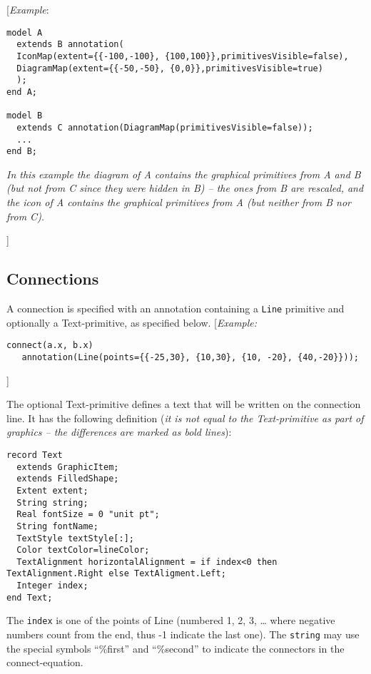 {[}\emph{Example}:

\begin{lstlisting}[language=modelica]
model A
  extends B annotation(
  IconMap(extent={{-100,-100}, {100,100}},primitivesVisible=false),
  DiagramMap(extent={{-50,-50}, {0,0}},primitivesVisible=true)
  );
end A;

model B
  extends C annotation(DiagramMap(primitivesVisible=false));
  ...
end B;
\end{lstlisting}
\emph{In this example the diagram of A contains the graphical primitives
from A and B (but not from C since they were hidden in B) -- the ones
from B are rescaled, and the icon of A contains the graphical primitives
from A (but neither from B nor from C).}

{]}

\subsection{Connections}

A connection is specified with an annotation containing a \lstinline!Line! primitive
and optionally a Text-primitive, as specified below. {[}\emph{Example:}
\begin{lstlisting}[language=modelica]
  connect(a.x, b.x)
   annotation(Line(points={{-25,30}, {10,30}, {10, -20}, {40,-20}}));
\end{lstlisting}

{]}

The optional Text-primitive defines a text that will be written on the
connection line. It has the following definition (\emph{it is not equal
to the Text-primitive as part of graphics -- the differences are marked as bold lines}):
\begin{lstlisting}[language=modelica,escapechar=!,emph={horizontalAlignment,string,index}, emphstyle=\textbf]
record Text
  extends GraphicItem;
  extends FilledShape;
  Extent extent;
  String string;
  Real fontSize = 0 "unit pt";
  String fontName;
  TextStyle textStyle[:];
  Color textColor=lineColor;
  TextAlignment horizontalAlignment = if index<0 then TextAlignment.Right else TextAligment.Left;
  Integer index;
end Text;
\end{lstlisting}

The \lstinline!index! is one of the points of Line (numbered 1, 2, 3, \ldots{} where
negative numbers count from the end, thus -1 indicate the last one). The \lstinline!string!
may use the special
symbols ``\%first'' and ``\%second'' to indicate the connectors in the
connect-equation.

